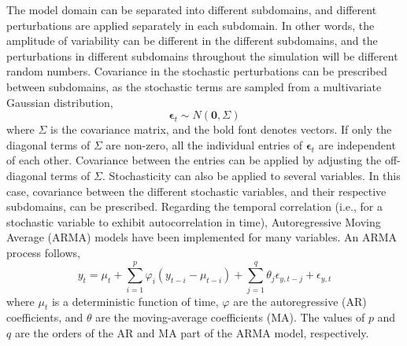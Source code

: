 The model domain can be separated into different subdomains, and different perturbations are applied separately in each subdomain. In other words, the amplitude of variability can be different in the different subdomains, and the perturbations in different subdomains throughout the simulation will be different random numbers. Covariance in the stochastic perturbations can be prescribed between subdomains, as the stochastic terms are sampled from a multivariate Gaussian distribution,
\begin{equation} \label{eq2}
	\boldsymbol{\epsilon}_{t} \sim N(\boldsymbol{0},\Sigma)
\end{equation}
where $\Sigma$ is the covariance matrix, and the bold font denotes vectors. If only the diagonal terms of $\Sigma$ are non-zero, all the individual entries of $\boldsymbol{\epsilon}_{t}$ are independent of each other. Covariance between the entries can be applied by adjusting the off-diagonal terms of $\Sigma$. Stochasticity can also be applied to several variables. In this case, covariance between the different stochastic variables, and their respective subdomains, can be prescribed. Regarding the temporal correlation (i.e., for a stochastic variable to exhibit autocorrelation in time), Autoregressive Moving Average (ARMA) models have been implemented for many variables. An ARMA process follows,
\begin{equation} \label{eq3}
	y_{t} = \mu_{t} + \sum_{i=1}^{p} \varphi_i \left(y_{t-i}-\mu_{t-i}\right) + \sum_{j=1}^{q} \theta_{j} \epsilon_{y,t-j} + \epsilon_{y,t}
\end{equation}
where $\mu_{t}$ is a deterministic function of time, $\varphi$ are the autoregressive (AR) coefficients, and $\theta$ are the moving-average coefficients (MA). The values of $p$ and $q$ are the orders of the AR and MA part of the ARMA model, respectively.

